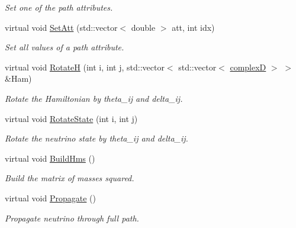 \begin{DoxyCompactItemize}
\begin{DoxyCompactList}\small\item\em Set one of the path attributes. \end{DoxyCompactList}\item 
virtual void \hyperlink{classOscProb_1_1PMNS__Base_aa001479b5f5828c3d16ed087f96ecbcc}{Set\+Att} (std\+::vector$<$ double $>$ att, int idx)
\begin{DoxyCompactList}\small\item\em Set all values of a path attribute. \end{DoxyCompactList}\item 
virtual void \hyperlink{classOscProb_1_1PMNS__Base_a6a3cf45bbe2349abf06708b65677c044}{RotateH} (int i, int j, std\+::vector$<$ std\+::vector$<$ \hyperlink{EigenPoint_8h_a67ca8e107e20610c3fff78d5e726ece0}{complexD} $>$ $>$ \&Ham)
\begin{DoxyCompactList}\small\item\em Rotate the Hamiltonian by theta\+\_\+ij and delta\+\_\+ij. \end{DoxyCompactList}\item 
virtual void \hyperlink{classOscProb_1_1PMNS__Base_ae52554477ad3250daa5adb8c32cab0b4}{Rotate\+State} (int i, int j)
\begin{DoxyCompactList}\small\item\em Rotate the neutrino state by theta\+\_\+ij and delta\+\_\+ij. \end{DoxyCompactList}\item 
virtual void \hyperlink{classOscProb_1_1PMNS__Base_ad0faf5eae755afb1baa1fcd5ffebad41}{Build\+Hms} ()
\begin{DoxyCompactList}\small\item\em Build the matrix of masses squared. \end{DoxyCompactList}\item 
virtual void \hyperlink{classOscProb_1_1PMNS__Base_a054e3a8b05b9a958b6fa416e4a835e3e}{Propagate} ()
\begin{DoxyCompactList}\small\item\em Propagate neutrino through full path. \end{DoxyCompactList}\end{DoxyCompactItemize}
